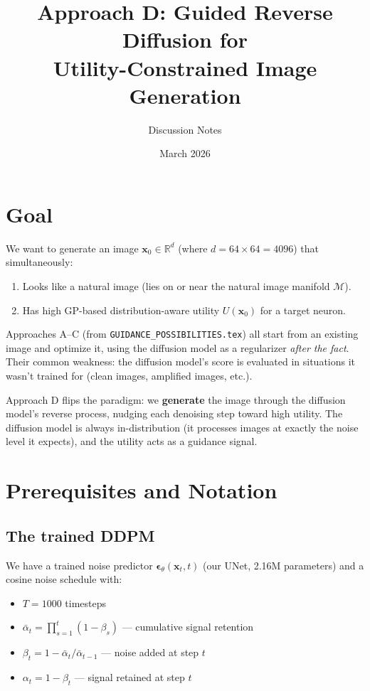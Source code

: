 \documentclass[11pt]{article}
\title{Approach D: Guided Reverse Diffusion for\\Utility-Constrained Image Generation}
\author{Discussion Notes}
\date{March 2026}
\newcommand{\xb}{\mathbf{x}}
\newcommand{\eb}{\boldsymbol{\epsilon}}
\newcommand{\R}{\mathbb{R}}
\newcommand{\alphabar}{\bar{\alpha}}
\begin{document}
\maketitle

\tableofcontents
\vspace{1em}

\section{Goal}

We want to generate an image $\xb_0 \in \R^d$ (where $d = 64 \times 64 = 4096$)
that simultaneously:
\begin{enumerate}[nosep]
    \item Looks like a natural image (lies on or near the natural image manifold $\mathcal{M}$).
    \item Has high GP-based distribution-aware utility $U(\xb_0)$ for a target neuron.
\end{enumerate}

Approaches A--C (from \texttt{GUIDANCE\_POSSIBILITIES.tex}) all start from an existing image
and optimize it, using the diffusion model as a regularizer \emph{after the fact}.
Their common weakness: the diffusion model's score is evaluated in situations it wasn't
trained for (clean images, amplified images, etc.).

Approach D flips the paradigm: we \textbf{generate} the image through the diffusion model's
reverse process, nudging each denoising step toward high utility. The diffusion model
is always in-distribution (it processes images at exactly the noise level it expects),
and the utility acts as a guidance signal.

\section{Prerequisites and Notation}

\subsection{The trained DDPM}

We have a trained noise predictor $\eb_\theta(\xb_t, t)$ (our UNet, 2.16M parameters)
and a cosine noise schedule with:
\begin{itemize}[nosep]
    \item $T = 1000$ timesteps
    \item $\alphabar_t = \prod_{s=1}^t (1 - \beta_s)$ --- cumulative signal retention
    \item $\beta_t = 1 - \alphabar_t / \alphabar_{t-1}$ --- noise added at step $t$
    \item $\alpha_t = 1 - \beta_t$ --- signal retained at step $t$
\end{itemize}
\end{document}
